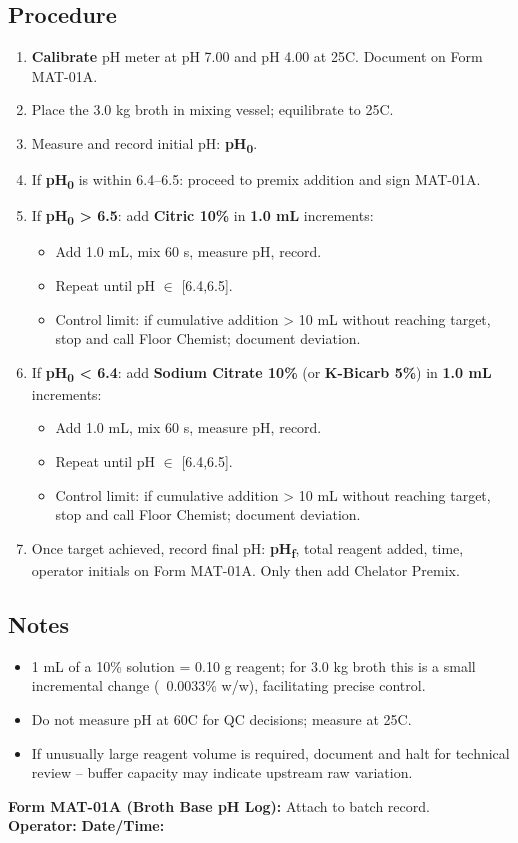 \subsection*{Procedure}
\begin{enumerate}[leftmargin=*,noitemsep]
  \item \textbf{Calibrate} pH meter at pH 7.00 and pH 4.00 at 25\textdegree C. Document on Form MAT-01A.
  \item Place the 3.0 kg broth in mixing vessel; equilibrate to 25\textdegree C.
  \item Measure and record initial pH: \textbf{pH\textsubscript{0}}.
  \item If \textbf{pH\textsubscript{0}} is within 6.4--6.5: proceed to premix addition and sign MAT-01A.
  \item If \textbf{pH\textsubscript{0} > 6.5}: add \textbf{Citric 10\%} in \textbf{1.0 mL} increments:
    \begin{itemize}[noitemsep]
      \item Add 1.0 mL, mix 60 s, measure pH, record.
      \item Repeat until pH \(\in\) [6.4,6.5].
      \item Control limit: if cumulative addition > 10 mL without reaching target, stop and call Floor Chemist; document deviation.
    \end{itemize}
  \item If \textbf{pH\textsubscript{0} < 6.4}: add \textbf{Sodium Citrate 10\%} (or \textbf{K-Bicarb 5\%}) in \textbf{1.0 mL} increments:
    \begin{itemize}[noitemsep]
      \item Add 1.0 mL, mix 60 s, measure pH, record.
      \item Repeat until pH \(\in\) [6.4,6.5].
      \item Control limit: if cumulative addition > 10 mL without reaching target, stop and call Floor Chemist; document deviation.
    \end{itemize}
  \item Once target achieved, record final pH: \textbf{pH\textsubscript{f}}, total reagent added, time, operator initials on Form MAT-01A. Only then add Chelator Premix.
\end{enumerate}

\subsection*{Notes}
\begin{itemize}[noitemsep]
  \item 1 mL of a 10\% solution = 0.10 g reagent; for 3.0 kg broth this is a small incremental change (~0.0033\% w/w), facilitating precise control.
  \item Do not measure pH at 60\textdegree C for QC decisions; measure at 25\textdegree C.
  \item If unusually large reagent volume is required, document and halt for technical review -- buffer capacity may indicate upstream raw variation.
\end{itemize}

\vspace{4mm}
\noindent\textbf{Form MAT-01A (Broth Base pH Log):} Attach to batch record.\\
\textbf{Operator:} \underline{\hspace{4cm}} \quad \textbf{Date/Time:} \underline{\hspace{3cm}}